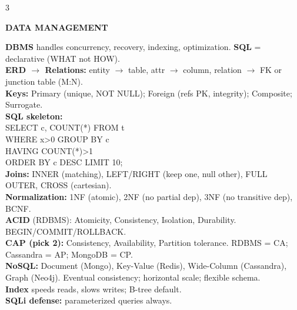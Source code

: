 \documentclass[10pt,letterpaper]{article}
\newenvironment{topic}[1]{%
  \par\addvspace{1.5pt}%
  \noindent\colorbox{hdrBG}{%
    \begin{minipage}{\dimexpr\linewidth-2\fboxsep\relax}%
      \centering\bfseries\sffamily\fontsize{6pt}{7pt}\selectfont\color{hdrFG}\MakeUppercase{#1}%
    \end{minipage}%
  }\par\nobreak\vskip0.5pt%
  \begingroup\setlength{\leftskip}{0pt}\setlength{\rightskip}{0pt}%
}{%
  \endgroup\par\addvspace{0.5pt}%
}
\newcommand{\hd}[1]{\textcolor{accent}{\textbf{#1}}}
\newcommand{\cn}[1]{{\ttfamily\small #1}}
\begin{document}
\begin{multicols*}{3}
\begin{topic}{Data Management}
\hd{DBMS} handles concurrency, recovery, indexing, optimization. \hd{SQL} = declarative (WHAT not HOW).\\
\hd{ERD $\to$ Relations:} entity $\to$ table, attr $\to$ column, relation $\to$ FK or junction table (M:N).\\
\hd{Keys:} Primary (unique, NOT NULL); Foreign (refs PK, integrity); Composite; Surrogate.\\
\hd{SQL skeleton:}\\
\cn{SELECT c, COUNT(*) FROM t}\\
\cn{ WHERE x>0 GROUP BY c}\\
\cn{ HAVING COUNT(*)>1}\\
\cn{ ORDER BY c DESC LIMIT 10;}\\
\hd{Joins:} INNER (matching), LEFT/RIGHT (keep one, null other), FULL OUTER, CROSS (cartesian).\\
\hd{Normalization:} 1NF (atomic), 2NF (no partial dep), 3NF (no transitive dep), BCNF.\\
\hd{ACID} (RDBMS): Atomicity, Consistency, Isolation, Durability. \cn{BEGIN/COMMIT/ROLLBACK}.\\
\hd{CAP (pick 2):} Consistency, Availability, Partition tolerance. RDBMS = CA; Cassandra = AP; MongoDB = CP.\\
\hd{NoSQL:} Document (Mongo), Key-Value (Redis), Wide-Column (Cassandra), Graph (Neo4j). Eventual consistency; horizontal scale; flexible schema.\\
\hd{Index} speeds reads, slows writes; B-tree default.\\
\hd{SQLi defense:} parameterized queries always.
\end{topic}


\end{multicols*}
\end{document}
